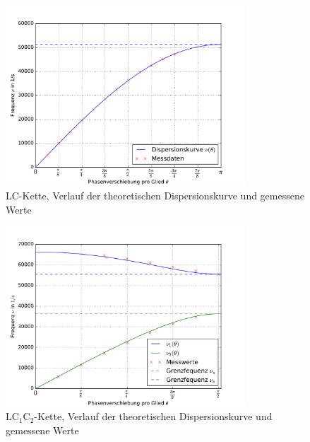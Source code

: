 \begin{figure}
  \centering
  \includegraphics[width = 0.8\textwidth]{../Messdaten/plots/dispersion.pdf}
  \caption{LC-Kette, Verlauf der theoretischen Dispersionskurve und gemessene Werte}
  \label{fig: dispersion_LC}
\end{figure}
\begin{figure}
  \centering
  \includegraphics[width = 0.8\textwidth]{../Messdaten/plots/dispersion1.pdf}
  \caption{$\mathup{LC_1C_2}$-Kette, Verlauf der theoretischen Dispersionskurve und gemessene Werte}
  \label{fig: dispersion_LC1C2}
\end{figure}
\FloatBarrier


